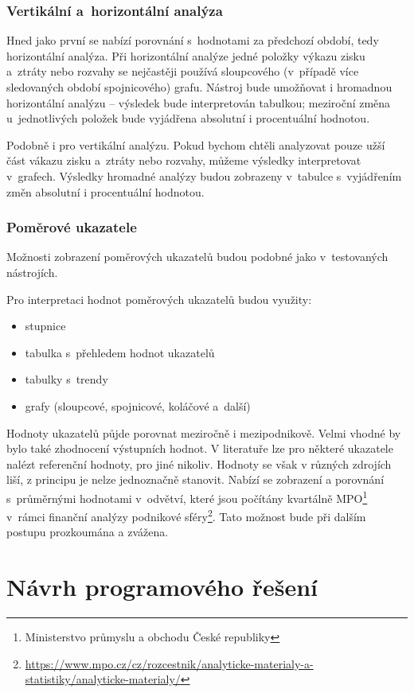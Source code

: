 \subsubsection{Vertikální a~horizontální analýza}
Hned jako první se nabízí porovnání s~hodnotami za předchozí období, tedy horizontální analýza. Při horizontální analýze jedné položky výkazu zisku a~ztráty nebo rozvahy se nejčastěji používá sloupcového (v~případě více sledovaných období spojnicového) grafu. Nástroj bude umožňovat i hromadnou horizontální analýzu -- výsledek bude interpretován tabulkou; meziroční změna u~jednotlivých položek bude vyjádřena absolutní i procentuální hodnotou.

Podobně i pro vertikální analýzu. Pokud bychom chtěli analyzovat pouze užší část vákazu zisku a~ztráty nebo rozvahy, můžeme výsledky interpretovat v~grafech. Výsledky hromadné analýzy budou zobrazeny v~tabulce s~vyjádřením změn absolutní i procentuální hodnotou.

\subsubsection{Poměrové ukazatele}
Možnosti zobrazení poměrových ukazatelů budou podobné jako v~testovaných nástrojích. 

Pro interpretaci hodnot poměrových ukazatelů budou využity:
\begin{itemize}
	\item stupnice
	\item tabulka s~přehledem hodnot ukazatelů
	\item tabulky s~trendy
	\item grafy (sloupcové, spojnicové, koláčové a~další)
\end{itemize}

Hodnoty ukazatelů půjde porovnat meziročně i mezipodnikově. Velmi vhodné by bylo také zhodnocení výstupních hodnot. V literatuře lze pro některé ukazatele nalézt referenční hodnoty, pro jiné nikoliv. Hodnoty se však v různých zdrojích liší, z principu je nelze jednoznačně stanovit. Nabízí se zobrazení a porovnání s~průměrnými hodnotami v~odvětví, které jsou počítány kvartálně MPO\footnote{Ministerstvo průmyslu a obchodu České republiky} v~rámci finanční analýzy podnikové sféry\footnote{\url{https://www.mpo.cz/cz/rozcestnik/analyticke-materialy-a-statistiky/analyticke-materialy/}}. Tato možnost bude při dalším postupu prozkoumána a zvážena.



\section{Návrh programového řešení}

